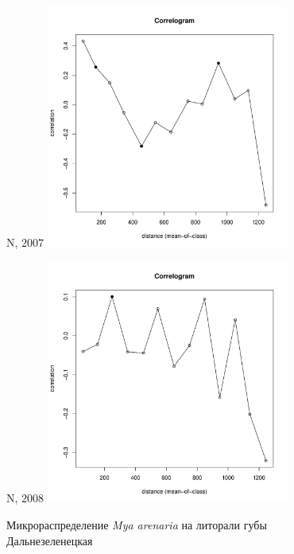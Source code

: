 \documentclass[12pt, a4paper]{disser}
\begin{document}
	\begin{figure}[h]
	\begin{minipage}[b]{.5\linewidth}
	\begin{center}
	{\small N, $2007$}
		\includegraphics[width=80mm]{../Barenc_Sea/distribution_Moran/Plyazh07_moran_N_Mya_arenaria_.pdf}
	\end{center}
	\end{minipage}
	\hfil %
	\begin{minipage}[b]{.5\linewidth}
	\begin{center}
	{\small N, $2008$}
		\includegraphics[width=80mm]{../Barenc_Sea/distribution_Moran/Plyazh0812_moran_N_Mya_arenaria_.pdf}
	\end{center}
	\end{minipage}

	\caption{Микрораспределение {\it Mya arenaria} на литорали губы Дальнезеленецкая}
	\label{ris:moransI_Plyazh_Mya}
	\end{figure}
\end{document}
